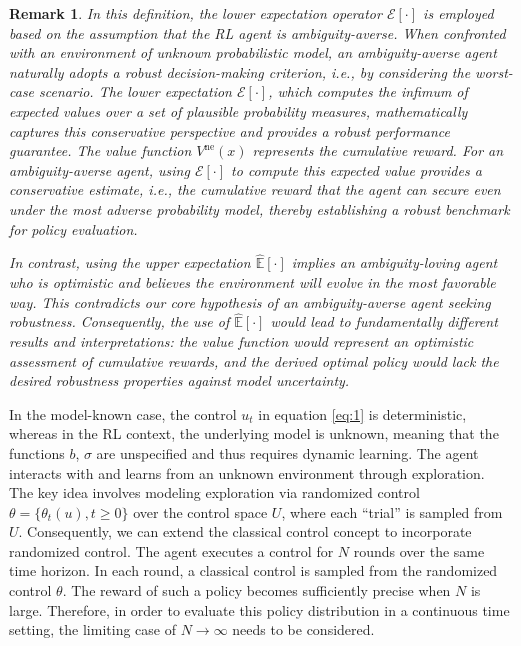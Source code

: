 \documentclass[onecolumn, journal]{IEEEtran} %
\newtheorem{remark}{Remark}
\begin{document}
	\begin{remark}
		In this definition, the lower expectation operator $\mathcal{E}[\cdot]$ is employed based on the assumption that the RL agent is ambiguity-averse. When confronted with an environment of unknown probabilistic model, an ambiguity-averse agent naturally adopts a robust decision-making criterion, i.e., by considering the worst-case scenario. The lower expectation $\mathcal{E}[\cdot]$, which computes the infimum of expected values over a set of plausible probability measures, mathematically captures this conservative perspective and provides a robust performance guarantee. The value function $V^{\text{ne}}(x)$ represents the cumulative reward. For an ambiguity-averse agent, using $\mathcal{E}[\cdot]$ to compute this expected value provides a conservative estimate, i.e., the cumulative reward that the agent can secure even under the most adverse probability model, thereby establishing a robust benchmark for policy evaluation.
		
		In contrast, using the upper expectation $\hat{\mathbb{E}}[\cdot]$ implies an ambiguity-loving agent who is optimistic and believes the environment will evolve in the most favorable way. This contradicts our core hypothesis of an ambiguity-averse agent seeking robustness. Consequently, the use of $\hat{\mathbb{E}}[\cdot]$ would lead to fundamentally different results and interpretations: the value function would represent an optimistic assessment of cumulative rewards, and the derived optimal policy would lack the desired robustness properties against model uncertainty.
	\end{remark}
	
	
	In the model-known case, the control $u_t$ in equation \eqref{eq:1} is deterministic, whereas in the RL context, the underlying model is unknown, meaning that the functions $b$, $\sigma$ are unspecified and thus requires dynamic learning. The agent interacts with and learns from an unknown environment through exploration. The key idea involves modeling exploration via randomized control $\theta = \{\theta_t(u), t \geq 0\}$ over the control space $U$, where each ``trial'' is sampled from $U$. Consequently, we can extend the classical control concept to incorporate randomized control. The agent executes a control for $N$ rounds over the same time horizon. In each round, a classical control is sampled from the randomized control $\theta$. The reward of such a policy becomes sufficiently precise when $N$ is large. Therefore, in order to evaluate this policy distribution in a continuous time setting, the limiting case of $N \to \infty$ needs to be considered.
	
\end{document}
